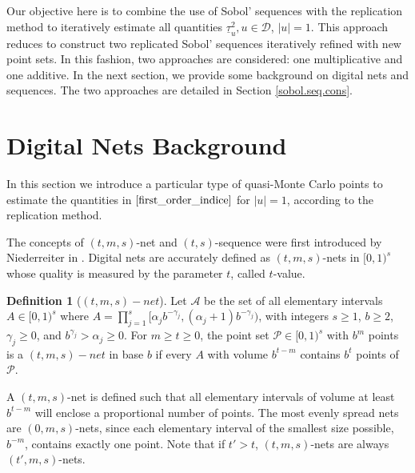 \documentclass[]{elsarticle}
\theoremstyle{definition}
\newtheorem{defin}{Definition}
\newcommand{\cube}{[0,1)^s}
\newcommand{\bvec}[1]{\boldsymbol{#1}}
\newcommand{\vx}{\bvec{x}}
\def\abs#1{\ensuremath{\left \lvert #1 \right \rvert}}
\begin{document}
Our objective here is to combine the use of Sobol' sequences \cite{sobolseq} with the replication method to iteratively estimate all quantities $\underline{\tau}_u^2, u \in \mathcal{D}$, $\abs{u}=1$. This approach reduces to construct two replicated Sobol' sequences iteratively refined with new point sets. In this fashion, two approaches are considered: one multiplicative and one additive. In the next section, we provide some background on digital nets and sequences. The two approaches are detailed in Section \ref{sobol.seq.cons}.

\section{Digital Nets Background}

In this section we introduce a particular type of quasi-Monte Carlo points to estimate the quantities in $\eqref{first_order_indice}$ for $\abs{u}=1$, according to the replication method. 

The concepts of $(t,m,s)$-net and $(t,s)$-sequence were first introduced by Niederreiter in \cite{niederreiter}. Digital nets are accurately defined as $(t,m,s)$-nets in $\cube$ whose quality is measured by the parameter $t$, called $t$-value. %
\begin{defin}[$(t,m,s)-net$]
Let $\mathcal{A}$ be the set of all elementary intervals $A\in\cube$ where $A=\prod_{j=1}^s [\alpha_jb^{-\gamma_j},(\alpha_j+1)b^{-\gamma_j})$, with integers $s\geq 1$, $b\geq 2$, $\gamma_j\geq 0$, and $b^{\gamma_j}>\alpha_j\geq 0$. For $m\geq t\geq 0$, the point set $\mathcal{P}\in\cube$ with $b^m$ points is a $(t,m,s)-net$ in base $b$ if every $A$ with volume $b^{t-m}$ contains $b^t$ points of $\mathcal{P}$.
\end{defin}

A $(t,m,s)$-net is defined such that all elementary intervals of volume at least $b^{t-m}$ will enclose a proportional number of points. The most evenly spread nets are $(0,m,s)$-nets, since each elementary interval of the smallest size possible, $b^{-m}$, contains exactly one point. Note that if $t'>t$, $(t,m,s)$-nets are always $(t',m,s)$-nets.
\end{document}
